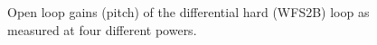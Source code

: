 \begin{figure}
\begin{centering}
\caption{Open loop gains (pitch) of the differential hard (WFS2B) loop as measured at four
  different powers.}
\label{fig:DHolgs}
\end{centering}
\end{figure}

